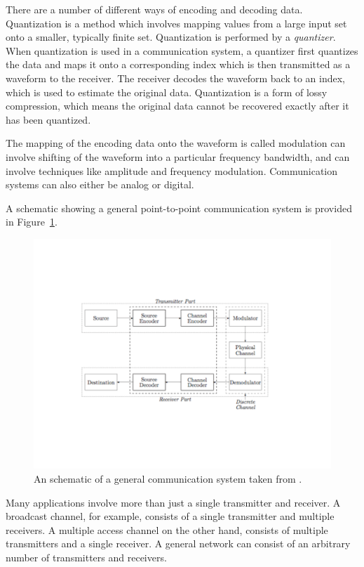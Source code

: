 \documentclass[10pt,twoside,titlepage]{article}
\begin{document}
There are a number of different ways of encoding and decoding data. Quantization is a method which involves mapping values from a large input set onto a smaller, typically finite set. Quantization is performed by a \emph{quantizer}. When quantization is used in a communication system, a quantizer first quantizes the data and maps it onto a corresponding index which is then transmitted as a waveform to the receiver. The receiver decodes the waveform back to an index, which is used to estimate the original data. Quantization is a form of lossy compression, which means the original data cannot be recovered exactly after it has been quantized.

The mapping of the encoding data onto the waveform is called modulation can involve shifting of the waveform into a particular frequency bandwidth, and can involve techniques like amplitude and frequency modulation. Communication systems can also either be analog or digital.

A schematic showing a general point-to-point communication system is provided in Figure~\ref{fig:comm_sys}.

\begin{figure}
        \centering
        \includegraphics[width=1.1\linewidth]{comm_sys.pdf}
    \caption{An schematic of a general communication system taken from \cite{472_notes}.}
    \label{fig:comm_sys}
\end{figure}

Many applications involve more than just a single transmitter and receiver. A broadcast channel, for example, consists of a single transmitter and multiple receivers. A multiple access channel on the other hand, consists of multiple transmitters and a single receiver. A general network can consist of an arbitrary number of transmitters and receivers.
\end{document}
